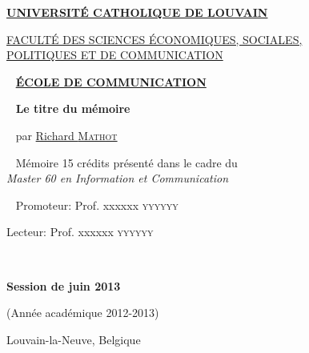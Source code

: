 
\begin{center}

\Large \href{http://www.uclouvain.be/}{\textbf{UNIVERSITÉ CATHOLIQUE DE LOUVAIN}}

\large \href{http://www.uclouvain.be/espo}{FACULTÉ DES SCIENCES ÉCONOMIQUES, SOCIALES, \\
POLITIQUES ET DE COMMUNICATION}

~ \vfill
\large \href{http://www.uclouvain.be/comu}{\textbf{ÉCOLE DE COMMUNICATION}}

~ \vfill
\huge\textbf{Le titre du mémoire}%

~ \vfill
\large par \href{mailto:richard.mathot@gmail.com}{Richard \textsc{Mathot}}

~ \vfill
\normalsize Mémoire 15 crédits présenté dans le cadre du \\
\emph{Master 60 en Information et Communication}

\end{center}


~ \vfill
\hspace{8cm} Promoteur: Prof. xxxxxx \textsc{yyyyyy}

\hspace{8cm} Lecteur: Prof. xxxxxx \textsc{yyyyyy}

~ \vfill

\begin{center}
\normalsize \textbf{Session de juin 2013}

(Année académique 2012-2013)

Louvain-la-Neuve, Belgique
\end{center}

\thispagestyle{empty}

